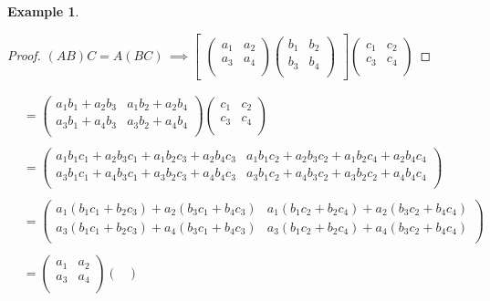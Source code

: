 \documentclass[11pt,a4paper]{article}
\theoremstyle{definition}
\newtheorem{exa}[thm]{Example}
\begin{document}
\begin{exa}
\begin{enumerate}
\begin{proof}
$(AB)C  = A(BC) \, \implies \begin{bmatrix}
\begin{pmatrix}
a_1 & a_2\\
a_3 & a_4\\
\end{pmatrix}\begin{pmatrix}
b_1 & b_2\\
b_3 & b_4\\
\end{pmatrix}
\end{bmatrix}\begin{pmatrix}
c_1 & c_2\\
c_3 & c_4\\
\end{pmatrix}$
\end{proof}
\begin{align*}
& = \begin{pmatrix}
a_1b_1 + a_2b_3 & a_1b_2 + a_2b_4\\
a_3b_1 + a_4b_3 & a_3b_2 + a_4b_4\\
\end{pmatrix}\begin{pmatrix}
c_1 & c_2\\
c_3 & c_4\\
\end{pmatrix}\\\\
& = \begin{pmatrix}
a_1b_1c_1 + a_2b_3c_1 + a_1b_2c_3 + a_2b_4c_3 & a_1b_1c_2 + a_2b_3c_2 + a_1b_2c_4 + a_2b_4c_4\\
a_3b_1c_1 + a_4b_3c_1 + a_3b_2c_3 + a_4b_4c_3 & a_3b_1c_2 + a_4b_3c_2 + a_3b_2c_2 + a_4b_4c_4\\
\end{pmatrix}\\\\
& = \begin{pmatrix}
a_1(b_1c_1 + b_2c_3) + a_2(b_3c_1 + b_4c_3) & a_1(b_1c_2 + b_2c_4) + a_2(b_3c_2 + b_4c_4)\\
a_3(b_1c_1 + b_2c_3) + a_4(b_3c_1 + b_4c_3) & a_3(b_1c_2 + b_2c_4) + a_4(b_3c_2 + b_4c_4)\\
\end{pmatrix}\\\\
& = \begin{pmatrix}
a_1 & a_2\\
a_3 & a_4\\
\end{pmatrix}\begin{pmatrix}

\end{pmatrix}
\end{align*}
\end{enumerate}
\end{exa}
\end{document}
